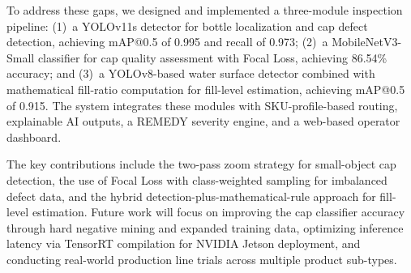 \documentclass{ieeeaccess}
\begin{document}
To address these gaps, we designed and implemented a three-module inspection pipeline: (1)~a YOLOv11s detector for bottle localization and cap defect detection, achieving mAP@0.5 of 0.995 and recall of 0.973; (2)~a MobileNetV3-Small classifier for cap quality assessment with Focal Loss, achieving 86.54\% accuracy; and (3)~a YOLOv8-based water surface detector combined with mathematical fill-ratio computation for fill-level estimation, achieving mAP@0.5 of 0.915. The system integrates these modules with SKU-profile-based routing, explainable AI outputs, a REMEDY severity engine, and a web-based operator dashboard.

The key contributions include the two-pass zoom strategy for small-object cap detection, the use of Focal Loss with class-weighted sampling for imbalanced defect data, and the hybrid detection-plus-mathematical-rule approach for fill-level estimation. Future work will focus on improving the cap classifier accuracy through hard negative mining and expanded training data, optimizing inference latency via TensorRT compilation for NVIDIA Jetson deployment, and conducting real-world production line trials across multiple product sub-types.
\end{document}
